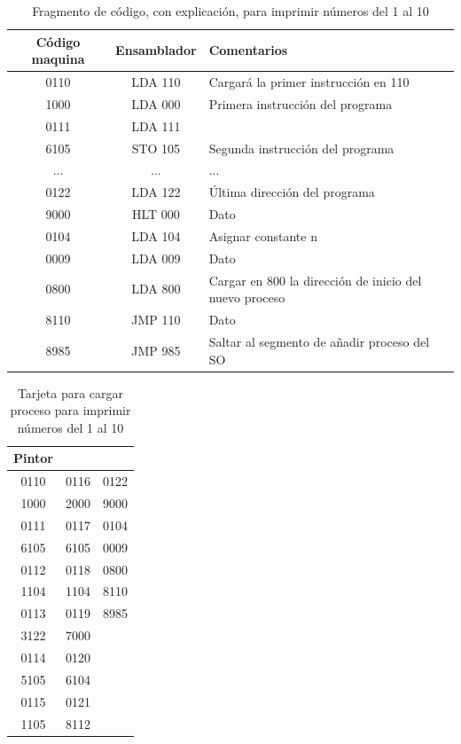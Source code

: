 \documentclass[letterpaper,12pt,oneside]{book}
\begin{document}
		
		\begin{table}[h]
			  \centering
			  \begin{tabular}{|c|c|p{8cm}|}
			    \hline
		    	\textbf{Código maquina} & \textbf{Ensamblador} & \textbf{Comentarios} \\
			    \hline
				0110  & LDA 110 & Cargará la primer instrucción en 110 \\
				\hline
				1000 & LDA 000 & Primera instrucción del programa \\
				\hline
				0111 & LDA 111 & \\
				\hline
				6105 & STO 105 & Segunda instrucción del programa \\
				\hline
				...&...&... \\
 				\hline
				0122 & LDA 122 & Última dirección del programa \\
				\hline
				9000 & HLT 000 & Dato \\
				\hline
				0104 & LDA 104 & Asignar constante n \\
				\hline
				0009 & LDA 009 & Dato \\
				\hline
				0800 & LDA 800 & Cargar en 800 la dirección de inicio del nuevo proceso \\
				\hline
				8110 &  JMP 110 & Dato \\
				\hline
				8985 & JMP 985 & Saltar al segmento de añadir proceso del SO \\
				\hline
			  \end{tabular}
			  \caption{Fragmento de código, con explicación, para imprimir números del 1 al 10}
			  \label{tab:fragmentoContador1a10}
			\end{table}
		
			\begin{table}[h]
			  \centering
			  \begin{tabular}{|c|c|c|}
			  \hline
				\textbf{Pintor}\\
			  \hline
			    0110	&	0116	&	0122	\\
				1000	&	2000	&	9000	\\
				0111	&	0117	&	0104	\\
				6105	&	6105	&	0009	\\
				0112	&	0118	&	0800	\\
				1104	&	1104	&	8110	\\
				0113	&	0119	&	8985	\\
				3122	&	7000	&		\\
				0114	&	0120	&		\\
				5105	&	6104	&		\\
				0115	&	0121	&		\\
				1105	&	8112	&		\\
				\hline
			  \end{tabular}
			  \caption{Tarjeta para cargar proceso para imprimir números del 1 al 10}
			  \label{tab:tarjetaContador1a10}
			\end{table}
			
\end{document}
